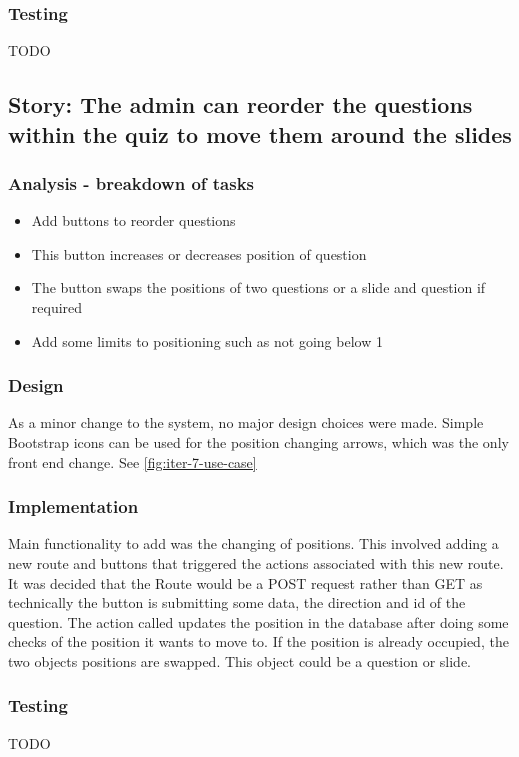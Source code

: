 \subsubsection{Testing}
TODO
\newpage

\subsection{Story: The admin can reorder the questions within the quiz to move them around the slides}
\subsubsection{Analysis - breakdown of tasks}
\begin{itemize}
	\item Add buttons to reorder questions
	\item This button increases or decreases position of question
	\item The button swaps the positions of two questions or a slide and question if required
	\item Add some limits to positioning such as not going below 1
\end{itemize}
\subsubsection{Design}
As a minor change to the system, no major design choices were made. Simple Bootstrap icons can be used for the position changing arrows, which was the only front end change.
See \ref{fig:iter-7-use-case} 
\subsubsection{Implementation}
Main functionality to add was the changing of positions. This involved adding a new route and buttons that triggered the actions associated with this new route. It was decided that the Route would be a POST request rather than GET as technically the button is submitting some data, the direction and id of the question. The action called updates the position in the database after doing some checks of the position it wants to move to. If the position is already occupied, the two objects positions are swapped. This object could be a question or slide.   
\subsubsection{Testing}
TODO
\newpage

